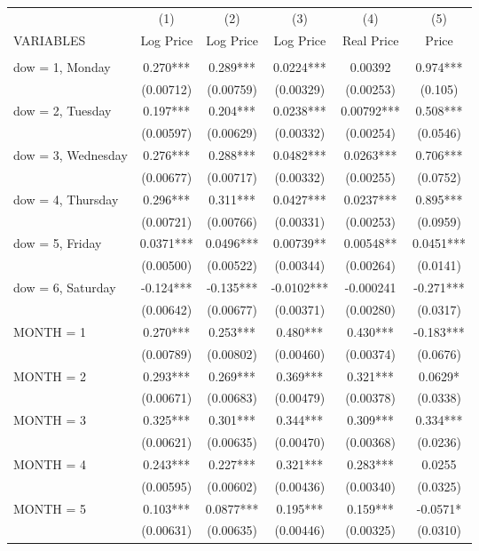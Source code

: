 \begin{tabular}{lccccc} \hline
 & (1) & (2) & (3) & (4) & (5) \\
VARIABLES & Log Price & Log Price & Log Price & Real Price & Price \\ \hline
 &  &  &  &  &  \\
dow = 1, Monday & 0.270*** & 0.289*** & 0.0224*** & 0.00392 & 0.974*** \\
 & (0.00712) & (0.00759) & (0.00329) & (0.00253) & (0.105) \\
dow = 2, Tuesday & 0.197*** & 0.204*** & 0.0238*** & 0.00792*** & 0.508*** \\
 & (0.00597) & (0.00629) & (0.00332) & (0.00254) & (0.0546) \\
dow = 3, Wednesday & 0.276*** & 0.288*** & 0.0482*** & 0.0263*** & 0.706*** \\
 & (0.00677) & (0.00717) & (0.00332) & (0.00255) & (0.0752) \\
dow = 4, Thursday & 0.296*** & 0.311*** & 0.0427*** & 0.0237*** & 0.895*** \\
 & (0.00721) & (0.00766) & (0.00331) & (0.00253) & (0.0959) \\
dow = 5, Friday & 0.0371*** & 0.0496*** & 0.00739** & 0.00548** & 0.0451*** \\
 & (0.00500) & (0.00522) & (0.00344) & (0.00264) & (0.0141) \\
dow = 6, Saturday & -0.124*** & -0.135*** & -0.0102*** & -0.000241 & -0.271*** \\
 & (0.00642) & (0.00677) & (0.00371) & (0.00280) & (0.0317) \\
MONTH = 1 & 0.270*** & 0.253*** & 0.480*** & 0.430*** & -0.183*** \\
 & (0.00789) & (0.00802) & (0.00460) & (0.00374) & (0.0676) \\
MONTH = 2 & 0.293*** & 0.269*** & 0.369*** & 0.321*** & 0.0629* \\
 & (0.00671) & (0.00683) & (0.00479) & (0.00378) & (0.0338) \\
MONTH = 3 & 0.325*** & 0.301*** & 0.344*** & 0.309*** & 0.334*** \\
 & (0.00621) & (0.00635) & (0.00470) & (0.00368) & (0.0236) \\
MONTH = 4 & 0.243*** & 0.227*** & 0.321*** & 0.283*** & 0.0255 \\
 & (0.00595) & (0.00602) & (0.00436) & (0.00340) & (0.0325) \\
MONTH = 5 & 0.103*** & 0.0877*** & 0.195*** & 0.159*** & -0.0571* \\
 & (0.00631) & (0.00635) & (0.00446) & (0.00325) & (0.0310) \\

\end{tabular}
